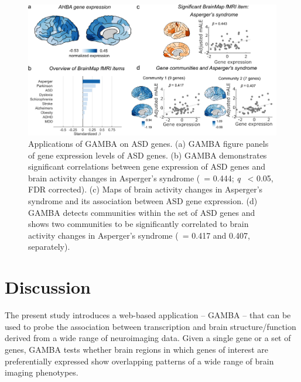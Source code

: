 \begin{refsection}
\begin{figure}[h]
    \centering
    \includegraphics[width=\linewidth]{images/gambaFig4.png}
    \caption{Applications of GAMBA on ASD genes. (a) GAMBA figure panels of gene expression levels of ASD genes. (b) GAMBA demonstrates significant correlations between gene expression of ASD genes and brain activity changes in Asperger's syndrome (\textbeta \ = 0.444; \textit{q} \ < 0.05, FDR corrected). (c) Maps of brain activity changes in Asperger's syndrome and its association between ASD gene expression. (d) GAMBA detects communities within the set of ASD genes and shows two communities to be significantly correlated to brain activity changes in Asperger's syndrome (\textbeta \ = 0.417 and 0.407, separately).}
    \label{gambaFig4}
\end{figure}


\section*{Discussion}

The present study introduces a web-based application – GAMBA – that can be used to probe the association between transcription and brain structure/function derived from a wide range of neuroimaging data. Given a single gene or a set of genes, GAMBA tests whether brain regions in which genes of interest are preferentially expressed show overlapping patterns of a wide range of brain imaging phenotypes. 


\end{refsection}
